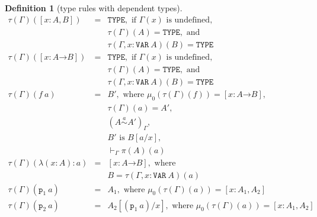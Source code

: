 \documentclass [12pt,twoside]{cslreport}
\newcommand{\thmbox}
   {{\ \hfill\hbox{%
      \vrule width1.0ex height1.0ex
   }\parfillskip 0pt }}
\newcommand{\aro}{\mathord\rightarrow} %
\newcommand{\funtype}[2]{[#1 \aro #2]}
\newcommand{\tupletype}[1]{[#1]}
\newcommand{\tauGamma}[1]{\tau(\Gamma)(#1)}
\newcommand{\proj}[1]{\mathtt{p}_{#1}}
\newcommand{\tttype}{\mathtt{TYPE}}
\newcommand{\ttvar}{\mathtt{VAR}}
\newcommand{\sima}{\stackrel{a}{\sim}} %
\newtheorem{definition}{Definition}
\newenvironment{Defn}[1]{\begin{definition}[#1]\label{defn:#1}}{
\thmbox\end{definition}}
\begin{document}
\begin{Defn}{type rules with dependent types}
\begin{eqnarray*}
\tauGamma{\tupletype{x : A, B}} & = &
\tttype{}, \mbox{ if } \Gamma(x) \mbox{ is undefined},\\
& & \tauGamma{A} = \tttype{}, \mbox{ and}\\
& & \tau(\Gamma, x : \ttvar{}\ A)(B) = \tttype{} \\
%
%
\tauGamma{\funtype{x: A}{B}} & = & \tttype{},
    \mbox{ if } \Gamma(x) \mbox{ is undefined},\\
& & \tauGamma{A} = \tttype{}, \mbox{ and}\\
& & \tau(\Gamma, x : \ttvar{}\ A)(B) = \tttype{}\\
%
  \tauGamma{f\ a} & = &  B', \mbox{ where } \mu_0(\tauGamma{f}) = \funtype{x :
A}{B},\\ 
 & &                   			\tauGamma{a} = A', \\ & & 
					(A \sima  A')_\Gamma, \\
& &
                                        B' \mbox{ is } B[a/x],\\ & & 
                                        \vdash_\Gamma \pi(A)(a)\\
%
 \tau(\Gamma)(\lambda (x : A): a) & = &
         \funtype{x : A}{B}, \mbox{ where}\\
& & B = \tau(\Gamma, x : \ttvar{}\ A)(a)\\ 
%
\tauGamma{\proj{1}~a} & = & A_1, \mbox{ where } \mu_0(\tauGamma{a}) =
\tupletype{x: A_1, A_2} \\
%
\tauGamma{\proj{2}~a} & = & A_2[(\proj{1}~a)/x], \mbox{ where } \mu_0(\tauGamma{a}) =
\tupletype{x: A_1, A_2} \\
\end{eqnarray*}
\end{Defn}
\end{document}
